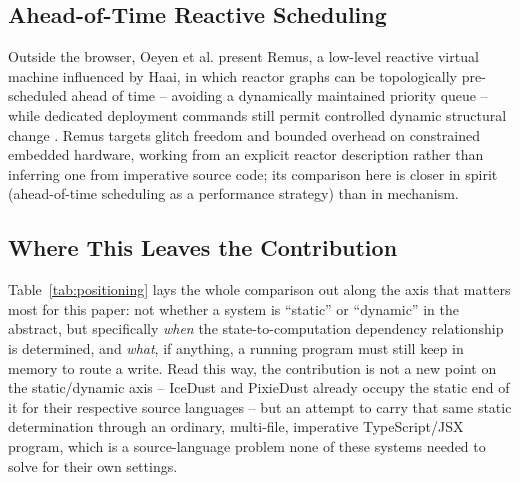 \documentclass[conference]{IEEEtran}
\begin{document}
\subsection{Ahead-of-Time Reactive Scheduling}

Outside the browser, Oeyen et al. present Remus, a low-level reactive virtual
machine influenced by Haai, in which reactor graphs can be topologically
pre-scheduled ahead of time -- avoiding a dynamically maintained priority
queue -- while dedicated deployment commands still permit controlled dynamic
structural change \cite{remus}. Remus targets glitch freedom and bounded
overhead on constrained embedded hardware, working from an explicit reactor
description rather than inferring one from imperative source code; its
comparison here is closer in spirit (ahead-of-time scheduling as a
performance strategy) than in mechanism.

\subsection{Where This Leaves the Contribution}

Table~\ref{tab:positioning} lays the whole comparison out along the axis that
matters most for this paper: not whether a system is ``static'' or
``dynamic'' in the abstract, but specifically \emph{when} the
state-to-computation dependency relationship is determined, and \emph{what},
if anything, a running program must still keep in memory to route a write.
Read this way, the contribution is not a new point on the static/dynamic
axis -- IceDust and PixieDust already occupy the static end of it for their
respective source languages -- but an attempt to carry that same static
determination through an ordinary, multi-file, imperative TypeScript/JSX
program, which is a source-language problem none of these systems needed to
solve for their own settings.
\end{document}
